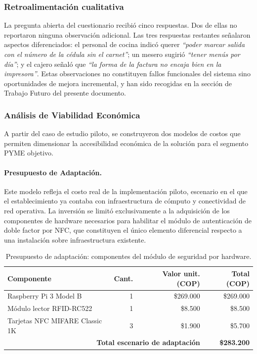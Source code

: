 \subsubsection*{Retroalimentación cualitativa}

La pregunta abierta del cuestionario recibi\'{o} cinco respuestas. Dos de ellas no reportaron 
ninguna observaci\'{o}n adicional. Las tres respuestas restantes se\~{n}alaron aspectos 
diferenciados: el personal de cocina indic\'{o} querer \textit{``poder marcar salida con el 
	n\'{u}mero de la c\'{e}dula sin el carnet''}; un mesero sugiri\'{o} \textit{``tener men\'{u}s 
	por d\'{i}a''}; y el cajero se\~{n}al\'{o} que \textit{``la forma de la factura no encaja bien 
	en la impresora''}. Estas observaciones no constituyen fallos funcionales del sistema sino 
oportunidades de mejora incremental, y han sido recogidas en la secci\'{o}n de Trabajo Futuro 
del presente documento.

\subsubsection*{Análisis de Viabilidad Económica}

A partir del caso de estudio piloto, se construyeron dos modelos de costos que permiten
dimensionar la accesibilidad económica de la solución para el segmento PYME objetivo.

\paragraph{Presupuesto de Adaptación.}
Este modelo refleja el costo real de la implementación piloto, escenario en el que el
establecimiento ya contaba con infraestructura de cómputo y conectividad de red operativa.
La inversión se limitó exclusivamente a la adquisición de los componentes de hardware
necesarios para habilitar el módulo de autenticación de doble factor por NFC, que
constituyen el único elemento diferencial respecto a una instalación sobre infraestructura
existente.

\begin{table}[H]
	\centering
	\caption{Presupuesto de adaptación: componentes del módulo de seguridad por hardware.}
	\label{tab:presupuesto_adaptacion}
	\begin{tabular}{p{6.5cm} r r r}
		\hline
		\textbf{Componente} & \textbf{Cant.} & \textbf{Valor unit. (COP)} & \textbf{Total (COP)} \\
		\hline
		Raspberry Pi 3 Model B          & 1 & \$269.000 & \$269.000 \\
		Módulo lector RFID-RC522        & 1 & \$8.500   & \$8.500   \\
		Tarjetas NFC MIFARE Classic 1K  & 3 & \$1.900   & \$5.700   \\
		\hline
		\multicolumn{3}{r}{\textbf{Total escenario de adaptación}} & \textbf{\$283.200} \\
		\hline
	\end{tabular}
\end{table}

